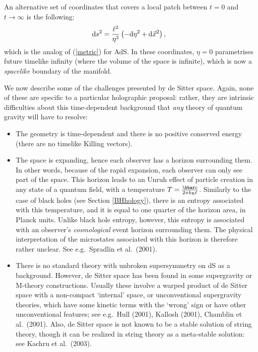 \documentclass[12pt]{article}
\def\dd{\mbox{d}}
\renewcommand{\^}[1]{\hat{#1}}
\newcommand{\tn}[1]{\mbox{\tiny #1}}
\newcommand{\bea}{\begin{eqnarray}}
\newcommand{\eea}{\end{eqnarray}}
\newcommand{\eq}[1]{(\ref{#1})}
\begin{document}
An alternative set of coordinates that covers a local patch between $t=0$ and $t\rightarrow\infty$ is the following:
\bea\label{eta}
\dd s^2={\ell^2\over\eta^2}\left(-\dd\eta^2+\dd{\vec x}^2\right),
\eea
which is the analog of \eq{metric} for AdS. In these coordinates, $\eta=0$ parametrises future timelike infinity (where the volume of the space is infinite), which is now a {\it spacelike} boundary of the manifold. 

We now describe some of the challenges presented by de Sitter space. Again, none of these are specific to a particular holographic proposal: rather, they are intrinsic difficulties about this time-dependent background that {\it any} theory of quantum gravity will have to resolve:
\begin{itemize}
\item The geometry is time-dependent and there is no positive conserved energy (there are no timelike Killing vectors). 

\item The space is expanding, hence each observer has a horizon surrounding them. In other words, because of the rapid expansion, each observer can only see part of the space. This horizon leads to an Unruh effect of particle creation in any state of a quantum field, with a temperature $T={\hbar c\over2\pi k_{\tn{B}}\ell}$.
 Similarly to the case of black holes (see Section \ref{BHhology}), there is an entropy associated with this temperature, and it is equal to one quarter of the horizon area, in Planck units. Unlike black hole entropy, however, this entropy is associated with an observer's {\it cosmological} event horizon surrounding them. The physical interpretation of the microstates associated with this horizon is therefore rather unclear. See e.g.~Spradlin et al.~(2001).

 \item There is no standard theory with unbroken supersymmetry on dS as a background. However, de Sitter space has been found in some supergravity or M-theory constructions. Usually these involve a warped product of de Sitter space with a non-compact `internal' space, or unconventional supergravity theories, which have some kinetic terms with the `wrong' sign or have other unconventional features; see e.g.~Hull (2001), Kallosh (2001), Chamblin et al.~(2001). Also, de Sitter space is not known to be a stable solution of string theory, though it can be realized in string theory as a meta-stable solution: see Kachru et al.~(2003).
 \end{itemize}
\end{document}
